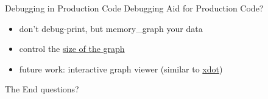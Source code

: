 \documentclass[10pt, colorlinks=true, urlcolor=blue]{beamer}
\begin{document}
\begin{frame}{Debugging in Production Code}
  Debugging Aid for Production Code?
  \begin{itemize}
  \item don't debug-print, but memory\_graph your data
  \item control the \href{https://memory-graph.com/\#codeurl=https://raw.githubusercontent.com/bterwijn/memory_graph/refs/heads/main/src/config.py}{size of the graph}
  \item future work: interactive graph viewer (similar to \href{https://github.com/jrfonseca/xdot.py}{xdot})
  \end{itemize}
\end{frame}

\begin{frame}{The End}
  questions?
\end{frame}
\end{document}
